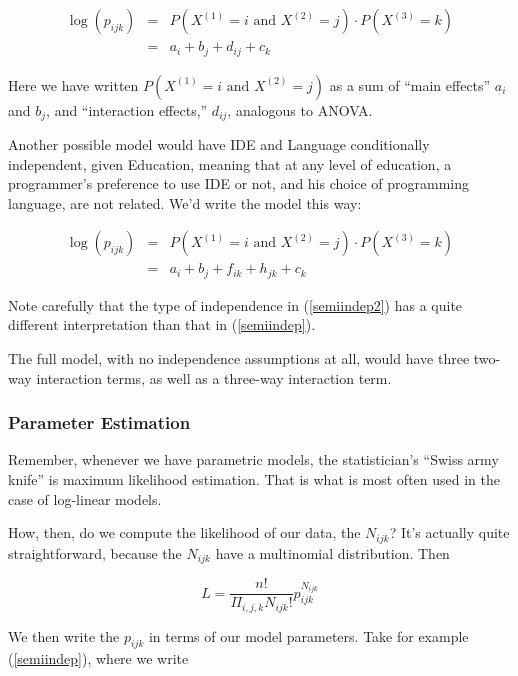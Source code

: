 \begin{eqnarray}
\log(p_{ijk}) &=& 
P \left ( X^{(1)} = i \textrm{ and } X^{(2)} = j \right )
\cdot P \left ( X^{(3)} = k \right ) \\
&=& a_i + b_j + d_{ij} + c_k \label{semiindep}
\end{eqnarray}

Here we have written $P \left ( X^{(1)} = i \textrm{ and } X^{(2)} =
j \right )$ as a sum of ``main effects'' $a_i$ and $b_j$, and
``interaction effects,'' $d_{ij}$, analogous to ANOVA.  

Another possible model would have IDE and Language conditionally
independent, given Education, meaning that at any level of education, a
programmer's preference to use IDE or not, and his choice of programming
language, are not related.  We'd write the model this way:

\begin{eqnarray}
\log(p_{ijk}) &=& 
P \left ( X^{(1)} = i \textrm{ and } X^{(2)} = j \right )
\cdot P \left ( X^{(3)} = k \right ) \\
&=& a_i + b_j + f_{ik} + h_{jk} + c_k \label{semiindep2}
\end{eqnarray}

Note carefully that the type of independence in (\ref{semiindep2}) has a
quite different interpretation than that in (\ref{semiindep}).

The full model, with no independence assumptions at all, would have
three two-way interaction terms, as well as a three-way interaction term.

\subsubsection{Parameter Estimation}

Remember, whenever we have parametric models, the statistician's ``Swiss
army knife'' is maximum likelihood estimation.  That is what is most
often used in the case of log-linear models.

How, then, do we compute the likelihood of our data, the $N_{ijk}$?
It's actually quite straightforward, because the $N_{ijk}$ have a
multinomial distribution.  Then 

\begin{equation}
\label{like}
L =
\frac
{n!}
{\Pi_{i,j,k} N_{ijk}!}
p_{ijk}^{N_{ijk}}
\end{equation}

We then write the $p_{ijk}$ in terms of our model parameters.
Take for example (\ref{semiindep}), where we write

